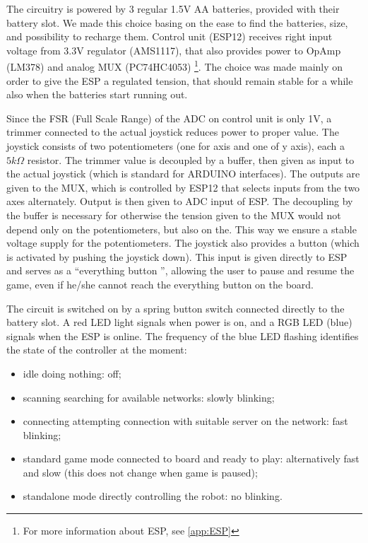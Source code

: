 \documentclass[a4paper,twoside]{book}
\begin{document}
The circuitry is powered by 3 regular 1.5V AA batteries, provided with their battery slot. We made this choice basing on the ease to find the batteries, size, and possibility to recharge them. Control unit (ESP12) receives right input voltage from 3.3V regulator (AMS1117), that also provides power to Op\textendash Amp (LM378) and analog MUX (PC74HC4053)
\footnote{For more information about ESP, see \autoref{app:ESP}}.
The choice was made mainly on order to give the ESP a regulated tension, that should remain stable for a while also when the batteries start running out.

Since the FSR (Full Scale Range) of the ADC on control unit is only 1V, a trimmer connected to the actual joystick reduces power to proper value. The joystick consists of two potentiometers (one for axis and one of y axis), each a $5k\Omega$ resistor.
The trimmer value is decoupled by a buffer, then given as input to the actual joystick (which is standard for ARDUINO interfaces). The outputs are given to the MUX, which is controlled by ESP12 that selects inputs from the two axes alternately. Output is then given to ADC input of ESP. The decoupling by the buffer is necessary for otherwise the tension given to the MUX would not depend only on the potentiometers, but also on the. This way we ensure a stable voltage supply for the potentiometers. 
The joystick also provides a button (which is activated by pushing the joystick down). This input is given directly to ESP and serves as a \textquotedblleft everything button \textquotedblright, allowing the user to pause and resume the game, even if he/she cannot reach the everything button on the board.

The circuit is switched on by a spring button switch connected directly to the battery slot. A red LED light signals when power is on, and a RGB LED (blue) signals when the ESP is online. The frequency of the blue LED flashing identifies the state of the controller at the moment:
\begin{itemize}
\item idle \textemdash doing nothing: off;
\item scanning \textemdash searching for available networks: slowly blinking;
\item connecting \textemdash attempting connection with suitable server on the network: fast blinking;
\item standard game mode \textemdash connected to board and ready to play: alternatively fast and slow (this does not change when game is paused);
\item standalone mode \textemdash directly controlling the robot: no blinking.
\end{itemize}
\end{document}
